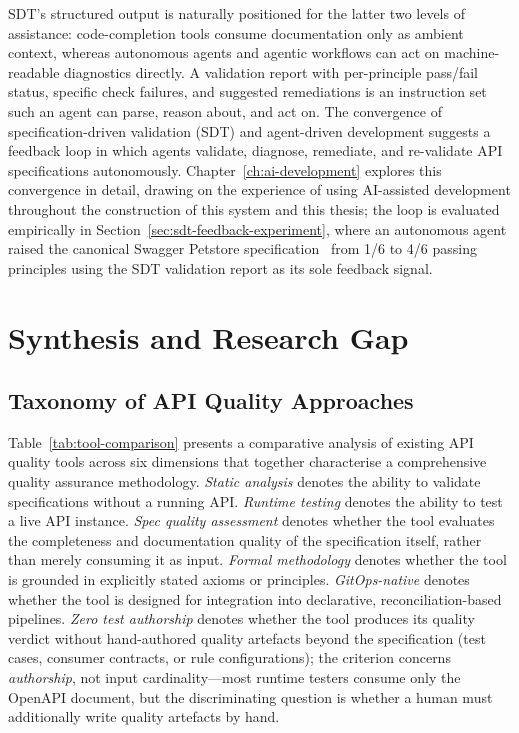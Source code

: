 SDT's structured output is naturally positioned for the latter two levels of assistance: code-completion tools consume documentation only as ambient context, whereas autonomous agents and agentic workflows can act on machine-readable diagnostics directly. A validation report with per-principle pass/fail status, specific check failures, and suggested remediations is an instruction set such an agent can parse, reason about, and act on. The convergence of specification-driven validation (SDT) and agent-driven development suggests a feedback loop in which agents validate, diagnose, remediate, and re-validate API specifications autonomously. Chapter~\ref{ch:ai-development} explores this convergence in detail, drawing on the experience of using AI-assisted development throughout the construction of this system and this thesis; the loop is evaluated empirically in Section~\ref{sec:sdt-feedback-experiment}, where an autonomous agent raised the canonical Swagger Petstore specification~\cite{swagger-petstore} from 1/6 to 4/6 passing principles using the SDT validation report as its sole feedback signal.

\section{Synthesis and Research Gap}
\label{sec:synthesis-gap}

\subsection{Taxonomy of API Quality Approaches}
\label{subsec:taxonomy}

Table~\ref{tab:tool-comparison} presents a comparative analysis of existing API quality tools across six dimensions that together characterise a comprehensive quality assurance methodology. \textit{Static analysis} denotes the ability to validate specifications without a running API. \textit{Runtime testing} denotes the ability to test a live API instance. \textit{Spec quality assessment} denotes whether the tool evaluates the completeness and documentation quality of the specification itself, rather than merely consuming it as input. \textit{Formal methodology} denotes whether the tool is grounded in explicitly stated axioms or principles. \textit{GitOps-native} denotes whether the tool is designed for integration into declarative, reconciliation-based pipelines. \textit{Zero test authorship} denotes whether the tool produces its quality verdict without hand-authored quality artefacts beyond the specification (test cases, consumer contracts, or rule configurations); the criterion concerns \emph{authorship}, not input cardinality---most runtime testers consume only the OpenAPI document, but the discriminating question is whether a human must additionally write quality artefacts by hand.

